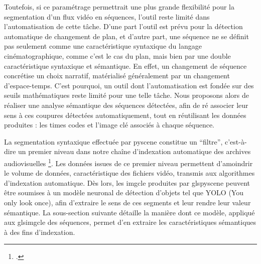 Toutefois, si ce paramétrage permettrait une plus grande flexibilité pour la segmentation d’un flux vidéo en séquences, l’outil reste limité dans l’automatisation de cette tâche. D’une part l’outil est prévu pour la détection automatique de changement de plan, et d’autre part, une séquence ne se définit pas seulement comme une caractéristique syntaxique du langage cinématographique, comme c'est le cas du plan, mais bien par une double caractéristique syntaxique et sémantique. En effet, un changement de séquence concrétise un choix narratif, matérialisé généralement par un changement d’espace-temps. C'est pourquoi, un outil dont l’automatisation est fondée sur des seuils mathématiques reste limité pour une telle tâche. Nous proposons alors de réaliser une analyse sémantique des séquences détectées, afin de ré associer leur sens à ces coupures détectées automatiquement, tout en réutilisant les données produites : les times codes et l'image clé associés à chaque séquence.  

La segmentation syntaxique effectuée par \gls{pyscene} constitue un “filtre”, c’est-à-dire un premier niveau dans notre chaîne d’indexation automatique des archives audiovisuelles \footcite{xin2023}. Les données issues de ce premier niveau permettent d’amoindrir le volume de données, caractéristique des fichiers vidéo, transmis aux algorithmes d’indexation automatique. Dès lors, les \gls{imgcle} produites par gls{pyscene} peuvent être soumises à un modèle neuronal de détection d’objets tel que YOLO (You only look once), afin d’extraire le sens de ces segments et leur rendre leur valeur sémantique. La sous-section suivante détaille la manière dont ce modèle, appliqué aux gls{imgcle} des séquences, permet d’en extraire les caractéristiques sémantiques à des fins d’indexation.  








